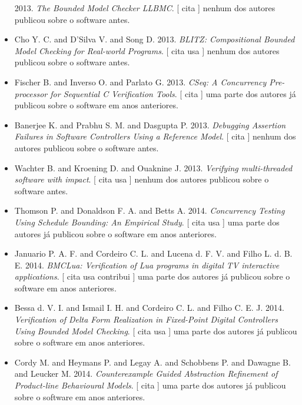 \begin{itemize}
      2013.
        \textit{ The Bounded Model Checker LLBMC}.
      [
          cita
      ]
nenhum dos autores publicou sobre o software antes.
\item Cho Y. C. and D'Silva V. and Song D.
      2013.
        \textit{ BLITZ: Compositional Bounded Model Checking for Real-world Programs}.
      [
          cita
          usa
      ]
nenhum dos autores publicou sobre o software antes.
\item Fischer B. and Inverso O. and Parlato G.
      2013.
        \textit{ CSeq: A Concurrency Pre-processor for Sequential C Verification Tools}.
      [
          cita
      ]
uma parte dos autores já publicou sobre o software em anos anteriores.
\item Banerjee K. and Prabhu S. M. and Dasgupta P.
      2013.
        \textit{ Debugging Assertion Failures in Software Controllers Using a Reference Model}.
      [
          cita
      ]
nenhum dos autores publicou sobre o software antes.
\item Wachter B. and Kroening D. and Ouaknine J.
      2013.
        \textit{ Verifying multi-threaded software with impact}.
      [
          cita
          usa
      ]
nenhum dos autores publicou sobre o software antes.
\item Thomson P. and Donaldson F. A. and Betts A.
      2014.
        \textit{ Concurrency Testing Using Schedule Bounding: An Empirical Study}.
      [
          cita
          usa
      ]
uma parte dos autores já publicou sobre o software em anos anteriores.
\item Januario P. A. F. and Cordeiro C. L. and Lucena d. F. V. and Filho L. d. B. E.
      2014.
        \textit{ BMCLua: Verification of Lua programs in digital TV interactive applications}.
      [
          cita
          usa
          contribui
      ]
uma parte dos autores já publicou sobre o software em anos anteriores.
\item Bessa d. V. I. and Ismail I. H. and Cordeiro C. L. and Filho C. E. J.
      2014.
        \textit{ Verification of Delta Form Realization in Fixed-Point Digital Controllers Using Bounded Model Checking}.
      [
          cita
          usa
      ]
uma parte dos autores já publicou sobre o software em anos anteriores.
\item Cordy M. and Heymans P. and Legay A. and Schobbens P. and Dawagne B. and Leucker M.
      2014.
        \textit{ Counterexample Guided Abstraction Refinement of Product-line Behavioural Models}.
      [
          cita
      ]
uma parte dos autores já publicou sobre o software em anos anteriores.

\end{itemize}
